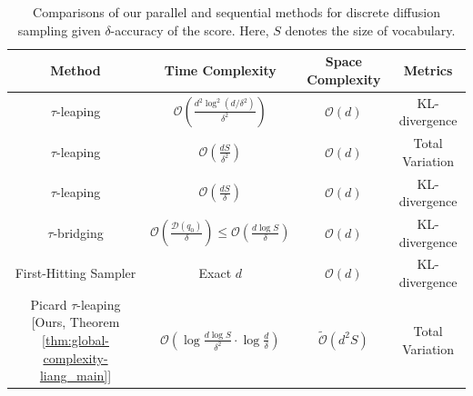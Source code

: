 \documentclass{article}
\begin{document}
\begin{table}[t]
\footnotesize
\renewcommand\arraystretch{1.4}
\centering
\captionsetup{skip=8pt}
\caption{Comparisons of our parallel and sequential methods for discrete diffusion sampling given $\delta$-accuracy of the score. Here, $S$ denotes the size of vocabulary.}

\label{table:results} 

\begin{tabular}{|c|c|c|c|} 
    \hline
        Method       & Time Complexity & Space Complexity & Metrics\\
    \hline
    $\tau$-leaping \citep[Theorem 4.7]{rendiscrete} & $\mathcal{O}(\frac{d^2\log^2(d/\delta^2)}{\delta^2})$ & $\mathcal{O}(d)$ & KL-divergence\\
    \hline
    $\tau$-leaping \citep[Theorem 3.1.3]{conforti2025non} & $\mathcal{O}(\frac{dS}{\delta^2})$& $\mathcal{O}(d)$ & Total Variation \\
    \hline 
    $\tau$-leaping \citep[Theorem 2]{liangabsorb} & $\mathcal{O}(\frac{d S}{\delta})$& $\mathcal{O}(d)$ & KL-divergence\\
    \hline
    $\tau$-bridging \citep[Theorem 2]{dmitriev2026efficient} & $\mathcal{O}(\frac{\mathcal{D}(q_0)}{\delta})\leq\mathcal{O}(\frac{d\log S}{\delta})$& $\mathcal{O}(d)$ & KL-divergence\\
    \hline
    First-Hitting Sampler \citep[Theorem 4]{liang2026sharp} & Exact $d$ & $\mathcal{O}(d)$ & KL-divergence\\
    \hline
    \rowcolor{blue!15}
    Picard $\tau$-leaping [Ours, Theorem \ref{thm:global-complexity-liang_main}] & $\mathcal{O}\left(
\log\frac{d \log S}{\delta^2}
\cdot
\log\frac{d}{\delta}
\right)$ &  $ \widetilde{\mathcal{O}}(d^{2}S)$ & Total Variation\\
    \hline
\end{tabular}
\end{table}





\end{document}

